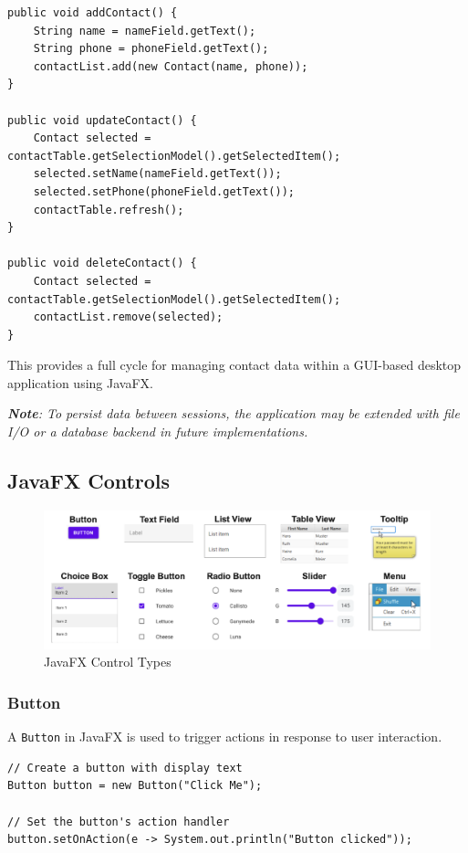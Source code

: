 \documentclass{article}
\newcommand{\codecmd}[1]{\textcolor[rgb]{0,0.5,0}{\texttt{#1}}}
\begin{document}
\begin{verbatim}
public void addContact() {
    String name = nameField.getText();
    String phone = phoneField.getText();
    contactList.add(new Contact(name, phone));
}

public void updateContact() {
    Contact selected = contactTable.getSelectionModel().getSelectedItem();
    selected.setName(nameField.getText());
    selected.setPhone(phoneField.getText());
    contactTable.refresh();
}

public void deleteContact() {
    Contact selected = contactTable.getSelectionModel().getSelectedItem();
    contactList.remove(selected);
}
\end{verbatim}

\noindent This provides a full cycle for managing contact data within a GUI-based desktop application using JavaFX.

\medskip
\textit{\textbf{Note}: To persist data between sessions, the application may be extended with file I/O or a database backend in future implementations.}

\subsection{JavaFX Controls}

\begin{figure}[h!]
\centering
\includegraphics[width=0.9\linewidth]{java-fx-fields.png}
\caption{JavaFX Control Types}
\label{fig:prototype-fidelity}
\end{figure}

\subsubsection{Button}

A \codecmd{Button} in JavaFX is used to trigger actions in response to user interaction.

\begin{verbatim}
// Create a button with display text
Button button = new Button("Click Me");

// Set the button's action handler
button.setOnAction(e -> System.out.println("Button clicked"));
\end{verbatim}
\end{document}
